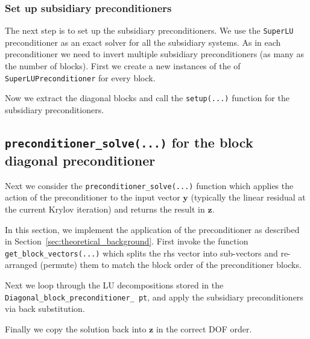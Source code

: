 \subsubsection{Set up subsidiary preconditioners\label{sec:set_up_subsidiary_preconditioners}}
The next step is to set up the subsidiary preconditioners. We use the
\texttt{SuperLU} preconditioner as an exact solver for all the subsidiary
systems. As in each preconditioner we need to invert multiple subsidiary
preconditioners (as many as the number of blocks). First we create a new
instances of the of \texttt{SuperLU\allowbreak Preconditioner} for every block.

Now we extract the diagonal blocks and call the \texttt{setup(...)} function for
the subsidiary preconditioners.


\subsection{\texttt{preconditioner\_solve(...)} for the block diagonal preconditioner\label{sec:preconditioner_solve_for_block_diagonal_preconditioner}}
Next we consider the \texttt{preconditioner\_\allowbreak solve(...)} function
which applies the action of the preconditioner to the input vector $\mathbf{y}$
(typically the linear residual at the current Krylov iteration) and returns the
result in $\mathbf{z}$.

In this section, we implement the application of the preconditioner as
described in Section~\ref{sec:theoretical_background}. First invoke the
function \texttt{get\_\allowbreak block\_\allowbreak vectors(...)} which splits
the rhs vector into sub-vectors and re-arranged (permute) them to match the
block order of the preconditioner blocks.

Next we loop through the LU decompositions stored in the
\texttt{Diagonal\_\allowbreak block\_\allowbreak preconditioner\_\allowbreak
  pt}, and apply the subsidiary preconditioners via back substitution.

Finally we copy the solution back into $\mathbf{z}$ in the correct DOF order.





